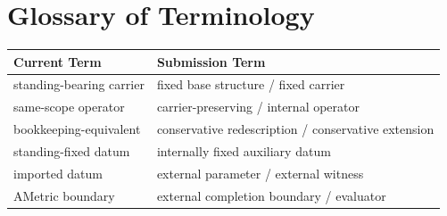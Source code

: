 \section{Glossary of Terminology}\label{app:glossary}

\begin{center}
\begin{tabular}{ll}
\toprule
Current Term & Submission Term \\
\midrule
standing-bearing carrier & fixed base structure / fixed carrier \\
same-scope operator & carrier-preserving / internal operator \\
bookkeeping-equivalent & conservative redescription / conservative extension \\
standing-fixed datum & internally fixed auxiliary datum \\
imported datum & external parameter / external witness \\
AMetric boundary & external completion boundary / evaluator \\
\bottomrule
\end{tabular}
\end{center}
